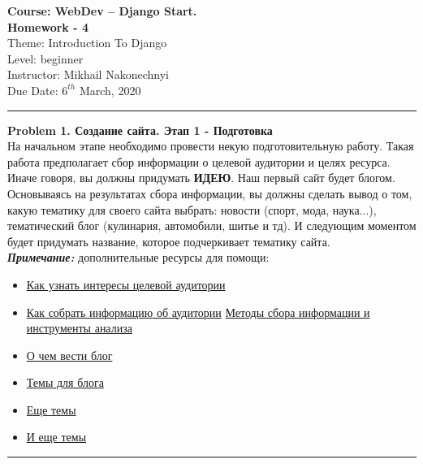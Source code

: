 \documentclass[a4paper, 11pt]{extarticle}
\newenvironment{problem}[2][Problem]
    { \begin{mdframed}[backgroundcolor=gray!20] \textbf{#1 #2} \\}
    {  \end{mdframed}}
\begin{document}

\noindent \LARGE{\textbf{Course: WebDev -- Django Start.}} \hfill  \\ 
\textbf{Homework - 4}  \hfill  \\

\noindent Theme: Introduction To Django \hfill  \\
Level: beginner\\
Instructor: Mikhail Nakonechnyi \\
Due Date: $6^{th}$ March, 2020 \\
\noindent\rule{6.257in}{2.8pt}

\begin{problem}{1. Создание сайта. Этап 1 - Подготовка}
На начальном этапе необходимо провести некую подготовительную работу. Такая работа предполагает сбор информации о целевой аудитории и целях ресурса. Иначе говоря, вы должны придумать \textbf{ИДЕЮ}. Наш первый сайт будет блогом. Основываясь на результатах сбора информации, вы должны сделать вывод о том, какую тематику для своего сайта выбрать: новости (спорт, мода, наука...), тематический блог (кулинария, автомобили, шитье и тд). И следующим моментом будет придумать название, которое подчеркивает тематику сайта. \\
\textit{\textbf{Примечание:}} дополнительные ресурсы для помощи:
\begin{itemize}
\item \href{https://blog.bigtime.ventures/kak-uznat-interesy-tselevoy-auditorii-metodiki-instrumenty-podkhody}{Как узнать интересы целевой аудитории}
\item \href{https://www.ucraft.ru/blog/kak-sobrat-informatsiyu-o-tsa-dlya-sajta}{Как собрать информацию об аудитории}
\href{https://www.marketing.spb.ru/lib-research/methods/collect_and_analysis.htm}{Методы сбора информации и инструменты анализа}
\item \href{https://texterra.ru/blog/o-chem-vesti-blog-26-idey-dlya-nachinayushchikh.html}{О чем вести блог}
\item \href{https://ifish2.ru/temy-dlya-bloga/}{Темы для блога}
\item \href{https://texterra.ru/blog/7-tem-dlya-bloga-kotorye-zatsepyat-lyubogo.html}{Еще темы}
\item \href{https://livesurf.ru/zhurnal/5719-idei-dlya-vedeniya-bloga.html}{И еще темы}
\end{itemize}
\end{problem}
\noindent\rule{6.257in}{2.8pt}
\end{document}
